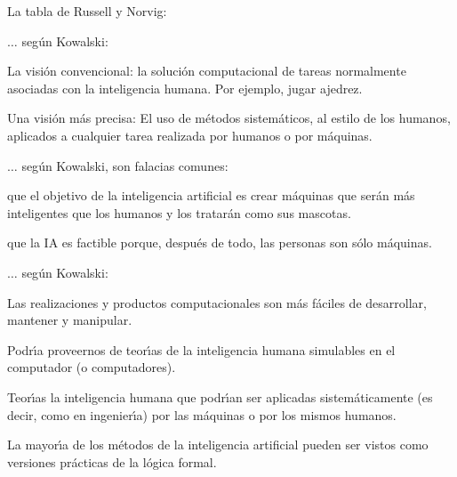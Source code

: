 \documentclass[10pt]{article}
\begin{document}
\begin{huge}

\vspace*{1in}

La tabla de Russell y Norvig:

\vspace*{1in}

\centerline{}



$\ldots$ seg{\'u}n Kowalski:

La visi{\'o}n convencional: la soluci{\'o}n computacional de
tareas normalmente asociadas con la inteligencia humana. Por
ejemplo, jugar ajedrez.

Una visi{\'o}n m{\'a}s precisa: El uso de m{\'e}todos
sistem{\'a}ticos, al estilo de los humanos, aplicados a cualquier
tarea realizada por humanos o por m{\'a}quinas.


$\ldots$ seg{\'u}n Kowalski, son falacias comunes:

\blob que el objetivo de la inteligencia artificial es crear
m{\'a}quinas que ser{\'a}n m{\'a}s inteligentes que los humanos y
los tratar{\'a}n como sus mascotas.

\blob que la IA es factible porque, despu{\'e}s de todo, las
personas son s{\'o}lo m{\'a}quinas.



$\ldots$ seg{\'u}n Kowalski:

\blob Las realizaciones y productos computacionales son m{\'a}s
f{\'a}ciles de desarrollar, mantener y manipular.

\blob Podr{\'\i}a proveernos de teor{\'\i}as de la inteligencia
humana simulables en el computador (o computadores).

\blob Teor{\'\i}as la inteligencia humana que podr{\'\i}an ser
aplicadas sistem{\'a}ticamente (es decir, como en ingenier{\'\i}a)
por las m{\'a}quinas o por los mismos humanos.

La mayor{\'\i}a de los m{\'e}todos de la inteligencia artificial
pueden ser vistos como versiones pr{\'a}cticas de la l{\'o}gica
formal.


\end{huge}
\end{document}
